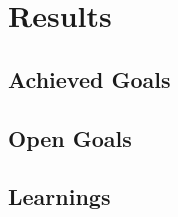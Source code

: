 \chapter*{Results}
\label{chap:Results}
\setcounter{section}{0}


\section{Achieved Goals}

\section{Open Goals}

\section{Learnings}